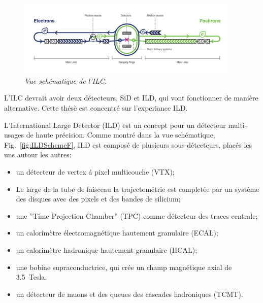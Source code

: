 \begin{figure}
	{\centering
		\includegraphics[width=0.95\textwidth]{graphics/ILC_scheme.jpg}
		\caption{\sl Vue sch\'ematique de l'ILC.}
		\label{fig:ILCSchemeF}
	}
\end{figure}

L’ILC devrait avoir deux d\'etecteurs, SiD et ILD, qui vont fonctionner de mani\`ere alternative.%
Cette th\'es\`e est concentr\'e sur l'experiance ILD. 

L'International Large Detector (ILD) est un concept pour un détecteur multi-usages de haute précision. %
Comme montr\'e dans la vue schématique, Fig.~\ref {fig:ILDSchemeF}, ILD est compos\'e de plusieurs sous-d\'etecteurs, plac\'es les uns autour les autres:
\begin{itemize}
	\item un d\'etecteur de vertex \'a pixel multicouche (VTX);
	\item Le large de la tube de faisceau la trajectométrie est completée par un système des disques avec des pixels et des bandes de silicium;
	\item une ”Time Projection Chamber” (TPC) comme d\'etecteur des traces centrale;
	\item un calorim\`etre \'electromagn\'etique hautement granulaire (ECAL);
	\item un calorim\`etre hadronique hautement granulaire (HCAL);
	\item une bobine supraconductrice, qui cr\'ee un champ magn\'etique axial de 3.5~Tesla.
	\item un d\'etecteur de muons et des queues des cascades hadroniques (TCMT).
\end{itemize}

